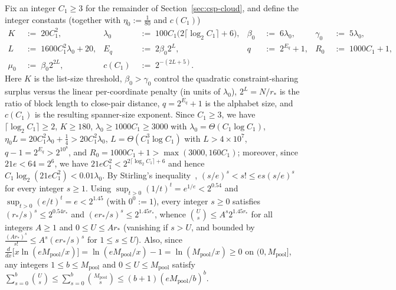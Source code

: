 \documentclass[11pt]{article}
\theoremstyle{definition}
\theoremstyle{remark}
\begin{document}
Fix an integer $C_1 \ge 3$ for the remainder of Section~\ref{sec:csp-cloud}, and define the integer constants (together with $\eta_0 := \frac{1}{80}$ and $c(C_1)$)
\begin{align*}
K &\;:=\; 20 C_1^2, & \lambda_0 &\;:=\; 100 C_1\bigl(2\lceil \log_2 C_1 \rceil + 6\bigr), & \beta_0 &\;:=\; 6 \lambda_0, & \gamma_0 &\;:=\; 5 \lambda_0, \\
L &\;:=\; 1600 C_1^2 \lambda_0 + 20, & E_q &\;:=\; 2 \beta_0 2^L, & q &\;:=\; 2^{E_q} + 1, & R_0 &\;:=\; 1000 C_1 + 1, \\
\mu_0 &\;:=\; \beta_0 2^{2 L}, & c(C_1) &\;:=\; 2^{-(2 L + 5)}.
\end{align*}
Here $K$ is the list-size threshold, $\beta_0 > \gamma_0$ control the quadratic constraint-sharing surplus versus the linear per-coordinate penalty (in units of $\lambda_0$), $2^L = N/r_*$ is the ratio of block length to close-pair distance, $q = 2^{E_q} + 1$ is the alphabet size, and $c(C_1)$ is the resulting spanner-size exponent. Since $C_1 \ge 3$, we have $\lceil \log_2 C_1 \rceil \ge 2$, $K \ge 180$, $\lambda_0 \ge 1000 C_1 \ge 3000$ with $\lambda_0 = \Theta(C_1 \log C_1)$, $\eta_0 L = 20 C_1^2 \lambda_0 + \frac{1}{4} > 20 C_1^2 \lambda_0$, $L = \Theta(C_1^3 \log C_1)$ with $L > 4 \times 10^7$, $q - 1 = 2^{E_q} > 2^{10^8}$, and $R_0 = 1000 C_1 + 1 > \max(3000, 160 C_1)$; moreover, since $21 e < 64 = 2^6$, we have $21 e C_1^2 < 2^{2\lceil \log_2 C_1 \rceil + 6}$ and hence $C_1 \log_2(21 e C_1^2) < 0.01 \lambda_0$. By Stirling's inequality~\cite{robbins1955remark}, $(s/e)^s < s! \le e s (s/e)^s$ for every integer $s \ge 1$. Using $\sup_{t > 0} (1/t)^t = e^{1/e} < 2^{0.54}$ and $\sup_{t > 0} (e/t)^t = e < 2^{1.45}$ (with $0^0 := 1$), every integer $s \ge 0$ satisfies $(r_*/s)^s \le 2^{0.54 r_*}$ and $(e r_*/s)^s \le 2^{1.45 r_*}$, whence $\binom{U}{s} \le A^s 2^{1.45 r_*}$ for all integers $A \ge 1$ and $0 \le U \le A r_*$ (vanishing if $s > U$, and bounded by $\frac{(A r_*)^s}{s!} \le A^s (e r_*/s)^s$ for $1 \le s \le U$). Also, since $\frac{d}{dx}\bigl[x\ln(e M_{\mathrm{pool}}/x)\bigr] = \ln(e M_{\mathrm{pool}}/x) - 1 = \ln(M_{\mathrm{pool}}/x) \ge 0$ on $(0, M_{\mathrm{pool}}]$, any integers $1 \le b \le M_{\mathrm{pool}}$ and $0 \le U \le M_{\mathrm{pool}}$ satisfy $\sum_{s=0}^b \binom{U}{s} \le \sum_{s=0}^b \binom{M_{\mathrm{pool}}}{s} \le (b + 1)(e M_{\mathrm{pool}}/b)^b$.
\end{document}
